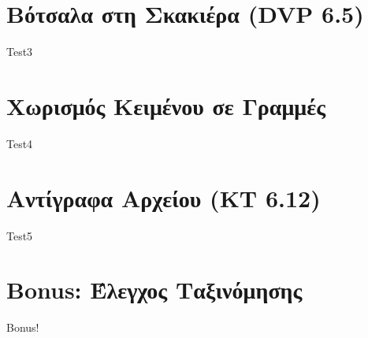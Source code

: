 \documentclass[a4paper,11pt]{article}
\begin{document}
\vspace{3cm}

\section{Βότσαλα στη Σκακιέρα (DVP 6.5)}
Test3

\vspace{3cm}

\section{Χωρισμός Κειμένου σε Γραμμές}
Test4

\vspace{3cm}

\section{Αντίγραφα Αρχείου (KT 6.12)}
Test5

\vspace{3cm}

\section{Bonus: Έλεγχος Ταξινόμησης}
Bonus!
\end{document}
